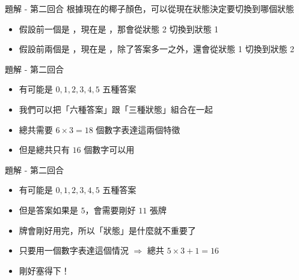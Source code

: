 \begin{frame}{題解 - 第二回合}
  根據現在的椰子顏色，可以從現在狀態決定要切換到哪個狀態
  \begin{itemize}
    \item 假設前一個是 ，現在是 ，那會從狀態 2 切換到狀態 1
    \item 假設前兩個是 ，現在是 ，除了答案多一之外，還會從狀態 1 切換到狀態 2
  \end{itemize}
\end{frame}

\begin{frame}{題解 - 第二回合}
  \begin{itemize}
    \item 有可能是 $0, 1, 2, 3, 4, 5$ 五種答案
    \item 我們可以把「六種答案」跟「三種狀態」組合在一起
      \item 總共需要 $6 \times 3 = 18$ 個數字表達這兩個特徵
      \item 但是總共只有 $16$ 個數字可以用 
  \end{itemize}
\end{frame}

\begin{frame}{題解 - 第二回合}
  \begin{itemize}
    \item 有可能是 $0, 1, 2, 3, 4, 5$ 五種答案
    \item 但是答案如果是 $5$，會需要剛好 $11$ 張牌
    \item 牌會剛好用完，所以「狀態」是什麼就不重要了
    \item 只要用一個數字表達這個情況 $\Rightarrow$ 總共 $5 \times 3 + 1 = 16$
    \item 剛好塞得下！
  \end{itemize}
\end{frame}

